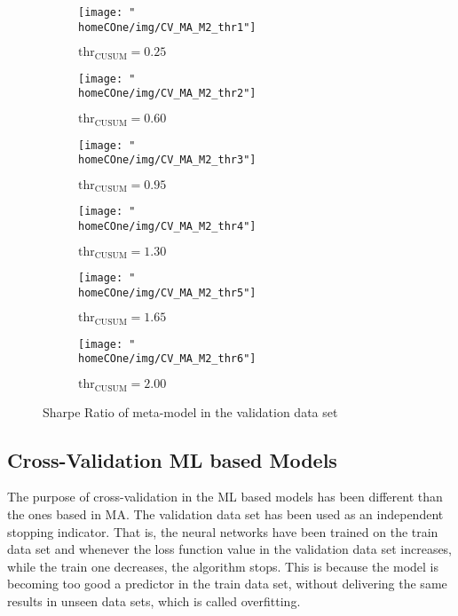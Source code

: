 \documentclass[a4paper]{report}
\newcommand{\homeCOne}{../../Chapter 1 - Metalabeling/Draft}
\begin{document}
\begin{figure}[htbp]
	\centering
	\begin{subfigure}{.5\textwidth}
  		\centering
  		\texttt{[image: "\\homeCOne/img/CV\_MA\_M2\_thr1"]}
  		\caption{$\text{thr}_{\text{CUSUM}} = 0.25$}
  		\label{fig:thr1}
	\end{subfigure}%
	\begin{subfigure}{.5\textwidth}
		\centering
		\texttt{[image: "\\homeCOne/img/CV\_MA\_M2\_thr2"]}
		\caption{$\text{thr}_{\text{CUSUM}} = 0.60$}
  		\label{fig:thr2}
	\end{subfigure}
	
	\vspace*{1cm}	
	
	\begin{subfigure}{.5\textwidth}
  		\centering
  		\texttt{[image: "\\homeCOne/img/CV\_MA\_M2\_thr3"]}
  		\caption{$\text{thr}_{\text{CUSUM}} = 0.95$}
  		\label{fig:thr3}
	\end{subfigure}%
	\begin{subfigure}{.5\textwidth}
  		\centering
  		\texttt{[image: "\\homeCOne/img/CV\_MA\_M2\_thr4"]}
  		\caption{$\text{thr}_{\text{CUSUM}} = 1.30$}
  		\label{fig:thr4}
	\end{subfigure}

	\vspace*{1cm}

	\begin{subfigure}{.5\textwidth}
  		\centering
  		\texttt{[image: "\\homeCOne/img/CV\_MA\_M2\_thr5"]}
  		\caption{$\text{thr}_{\text{CUSUM}} = 1.65$}
		\label{fig:thr5}
	\end{subfigure}%
	\begin{subfigure}{.5\textwidth}
  		\centering
  		\texttt{[image: "\\homeCOne/img/CV\_MA\_M2\_thr6"]}
  		\caption{$\text{thr}_{\text{CUSUM}} = 2.00$}
  		\label{fig:thr6}
	\end{subfigure}
	\caption{Sharpe Ratio of meta-model in the validation data set}
	\label{fig:SRMMCVthresholds}
\end{figure}

\newpage

\subsection{Cross-Validation ML based Models}
The purpose of cross-validation in the ML based models has been different 
than the ones based in MA. The validation data set has been used as an 
independent stopping indicator. That is, the neural networks have been 
trained on the train data set and whenever the loss function value in the 
validation data set increases, while the train one decreases, the algorithm 
stops. This is because the model is becoming too good a predictor in the 
train data set, without delivering the same results in unseen data sets, 
which is called overfitting.\\
\end{document}
